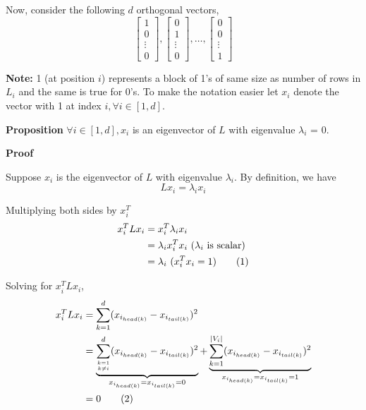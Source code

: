 \documentclass[12pt,a4paper]{article}
\newcommand\numberthis{\addtocounter{equation}{1}\tag{\theequation}}
\begin{document}
Now, consider the following $d$ orthogonal vectors,
\begin{equation}
    \begin{bmatrix}
        1 \\
        0 \\
        \vdots \\
        0
    \end{bmatrix},
    \begin{bmatrix}
        0 \\
        1 \\
        \vdots \\
        0
    \end{bmatrix},
    \hdots,
    \begin{bmatrix}
        0 \\
        0 \\
        \vdots \\
        1
    \end{bmatrix}
\end{equation}

\textbf{Note:} 1 (at position $i$) represents a block of 1's of same size as number of rows in $L_i$ and the same is true for 0's. To make the notation easier let $x_i$ denote the vector with 1 at index $i, \forall i \in [1,d]$.

\textbf{Proposition} $\forall i \in [1,d], x_i$ is an eigenvector of $L$ with eigenvalue $\lambda_i$ = 0.

\textbf{Proof}

Suppose $x_i$ is the eigenvector of $L$ with eigenvalue $\lambda_i$. By definition, we have
\begin{equation*}
    Lx_i = \lambda_i x_i
\end{equation*}

Multiplying both sides by $x_i^T$
\begin{align*}
    x_i^TLx_i &= x_i^T\lambda_i x_i \\
              &= \lambda_i x_i^Tx_i \text{ ($\lambda_i$ is scalar)} \\
              &= \lambda_i \text{ ($x_i^Tx_i = 1$)} \numberthis \label{eq:eigen}
\end{align*}

Solving for $x_i^TLx_i$,
\begin{align*}
    x_i^TLx_i &= \sum\limits_{k=1}^d (x_{i_{head(k)}} - x_{i_{tail(k)}})^2 \\
              &= \underbrace{\sum\limits_{k=1\atop k\neq i}^{d}(x_{i_{head(k)}} - x_{i_{tail(k)}})^2}_{x_{i_{head(k)}} = x_{i_{tail(k)}} = 0} + \underbrace{\sum\limits_{k=1}^{|V_i|}(x_{i_{head(k)}} - x_{i_{tail(k)}})^2}_{x_{i_{head(k)}} = x_{i_{tail(k)}} = 1} \\
              &= 0 \numberthis \label{eq:26}
\end{align*}
\end{document}
